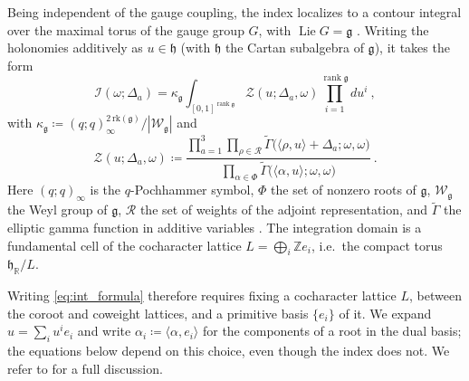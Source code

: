 \documentclass[aps, prx, nofootinbib, twocolumn,amsfonts,amsmath,amssymb,mathtools,superscriptaddress,preprintnumbers,floatfix,reprint]{revtex4-2}
\newcommand{\alg}{\mathfrak{g}}
\DeclareMathOperator{\rank}{rank}
\begin{document}
Being independent of the gauge coupling, the index localizes to a contour
integral over the maximal torus of the gauge group $G$, with
$\operatorname{Lie}G=\alg$ \cite{Romelsberger:2005eg,Dolan:2008qi}. Writing the
holonomies additively as $u\in\mathfrak{h}$ (with $\mathfrak{h}$ the Cartan subalgebra of $
\alg$), it takes the form
\begin{equation}\label{eq:int_formula}
  \mathcal{I}(\omega;\Delta_a)=\kappa_\alg\int_{[0,1]^{\rank\alg}}
  \mathcal{Z}(u;\Delta_a,\omega)\prod_{i=1}^{\rank\alg}du^i\ ,
\end{equation}
with $\kappa_\alg \coloneqq (q;q)_\infty^{2\,\mathrm{rk}(\mathfrak{g})}/|\mathcal{W}_{\mathfrak{g}}|$ and
  \begin{equation}\label{eq:Zintegrand}
  \mathcal{Z}(u;\Delta_a,\omega) \coloneqq 
  \frac{\prod_{a=1}^{3}\prod_{\rho\in\mathcal{R}}
  \tilde\Gamma\big(\langle\rho,u\rangle+\Delta_a;\omega,\omega\big)}
  {\prod_{\alpha\in\Phi}
  \tilde\Gamma\big(\langle\alpha,u\rangle;\omega,\omega\big)}\ .
\end{equation}
Here $(q;q)_\infty$ is the $q$-Pochhammer symbol, $\Phi$ the set of nonzero roots of $\alg$, $\mathcal{W}_\alg$ the Weyl group of $\alg$, $\mathcal{R}$ the set of
weights of the adjoint representation, and $\tilde\Gamma$ the elliptic gamma
function in additive variables \cite{Felder:1999vf}. The
integration domain is a fundamental cell of the cocharacter lattice
$L=\bigoplus_i\mathbb{Z}e_i$, i.e.\ the compact torus
$\mathfrak{h}_\mathbb{R}/L$.

Writing \eqref{eq:int_formula} therefore requires fixing a cocharacter lattice
$L$, between the coroot and coweight lattices, and a primitive basis
$\{e_i\}$ of it. We expand $u=\sum_iu^ie_i$ and write
$\alpha_i\coloneqq\langle\alpha,e_i\rangle$ for the components of a root in the dual
basis; the equations below depend on this choice, even though the index does
not. We refer to \cite{B2paper} for a full discussion.
\end{document}
